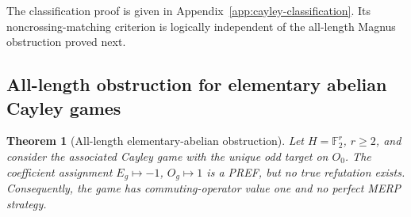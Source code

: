 \documentclass[11pt]{article}
\newtheorem{theorem}{Theorem}[section]
\theoremstyle{definition}
\theoremstyle{remark}
\newcommand{\F}{\mathbb{F}}
\numberwithin{equation}{section}
\begin{document}
The classification proof is given in
Appendix~\ref{app:cayley-classification}.  Its noncrossing-matching
criterion is logically independent of the all-length Magnus obstruction
proved next.

\subsection{All-length obstruction for elementary abelian Cayley games}
\label{sec:magnus}

\begin{theorem}[All-length elementary-abelian obstruction]
\label{thm:all-length-obstruction}
Let \(H=\F_2^r\), \(r\geq2\), and consider the associated Cayley game with
the unique odd target on \(O_0\).  The coefficient assignment
\(E_g\mapsto-1\), \(O_g\mapsto1\) is a PREF, but no true refutation exists.
Consequently, the game has commuting-operator value one and no perfect MERP
strategy.
\end{theorem}
\end{document}
